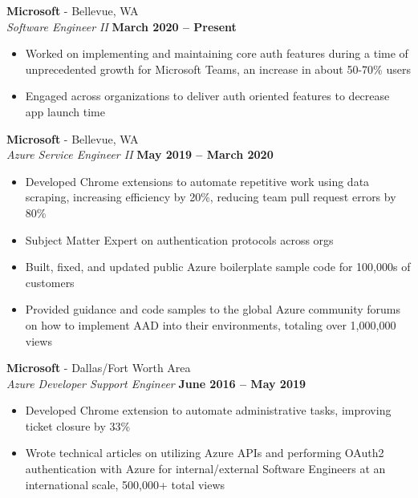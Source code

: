 \documentclass[margin,line]{resume}
\begin{document}
\begin{resume}
	
	\textbf{Microsoft} - Bellevue, WA \vspace{1mm}\\\vspace{1mm}
	\textsl{Software Engineer II} \hfill \textbf{March 2020  -- Present}
	\begin{itemize}
		\item Worked on implementing and maintaining core auth features during a time of unprecedented growth for Microsoft Teams, an increase in about 50-70\% users 
		\item Engaged across organizations to deliver auth oriented features to decrease app launch time
	\end{itemize}
	
	\textbf{Microsoft} - Bellevue, WA \vspace{1mm}\\\vspace{1mm}
	\textsl{Azure Service Engineer II} \hfill \textbf{May 2019 -- March 2020}
	\begin{itemize}
		\item Developed Chrome extensions to automate repetitive work using data scraping, increasing efficiency by 20\%, reducing team pull request errors by 80\%
		\item Subject Matter Expert on authentication protocols across orgs
		\item Built, fixed, and updated public Azure boilerplate sample code for 100,000s of customers
		\item Provided guidance and code samples to the global Azure community forums on how to implement AAD  into their environments, totaling over 1,000,000 views 
	\end{itemize}
		
	\textbf{Microsoft} - Dallas/Fort Worth Area\vspace{1mm}\\\vspace{1mm}
	\textsl{Azure Developer Support Engineer} \hfill \textbf{June 2016 -- May 2019}
	\begin{itemize}
		 \item Developed Chrome extension to automate administrative tasks, improving ticket closure by 33\%
		 \item Wrote technical articles on utilizing Azure APIs and performing OAuth2 authentication with Azure for internal/external Software Engineers at an international scale, 500,000+ total views
	

\end{itemize}
\end{resume}
\end{document}
